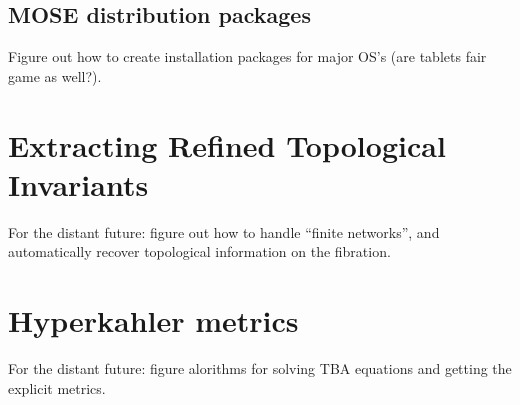 \documentclass[11pt]{report}
\begin{document}
\section{MOSE distribution packages}
Figure out how to create installation packages for major OS's (are tablets fair game as well?).


\chapter{Extracting Refined Topological Invariants}

For the distant future: figure out how to handle ``finite networks'', and automatically recover topological information on the fibration.





\chapter{Hyperkahler metrics}

For the distant future: figure alorithms for solving TBA equations and getting the explicit metrics.
\end{document}
